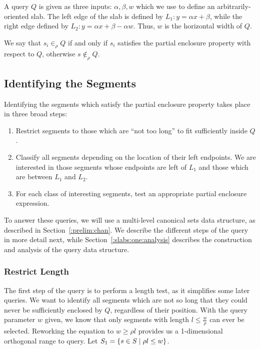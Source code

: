 A query $Q$ is given as three inputs: $\alpha, \beta, w$ which we use to define an arbitrarily-oriented slab.
The left edge of the slab is defined by $L_1 : y = \alpha x + \beta$, while the right edge defined by $L_2: y = \alpha x + \beta - \alpha w$. 
Thus, $w$ is the horizontal width of $Q$.

We say that $s_i \in_\rho Q$ if and only if $s_i$ satisfies the partial enclosure property with respect to $Q$, otherwise $s \not \in_\rho Q$.


\subsection{Identifying the Segments}
\label{:slabs:one:approach}

Identifying the segments which satisfy the partial enclosure property takes place in three broad steps:

\begin{enumerate}
 \item Restrict segments to those which are ``not too long'' to fit sufficiently inside $Q$.

 \item Classify all segments depending on the location of their left endpoints. We are interested in those segments whose endpoints are left of $L_1$ and those which are between $L_1$ and $L_2$.

 \item For each class of interesting segments, test an appropriate partial enclosure expression.

\end{enumerate}

To answer these queries, we will use a multi-level canonical sets data structure, as described in Section~\ref{:prelim:chan}. 
We describe the different steps of the query in more detail next, while Section~\ref{:slabs:one:analysis} describes the construction and analysis of the query data structure.


\subsubsection{Restrict Length}
\label{:slabs:one:details:restrict}

The first step of the query is to perform a length test, as it simplifies some later queries.  We want to identify all segments which are not so long that they could never be sufficiently enclosed by $Q$, regardless of their position. With the query parameter $w$ given, we know that only segments with length $l \leq \frac{w}{\rho}$ can ever be selected. Reworking the equation to $w \geq \rho l$ provides us a 1-dimensional orthogonal range to query. Let $S_1 = \{ s \in S \;|\; \rho l \leq w \}$.


